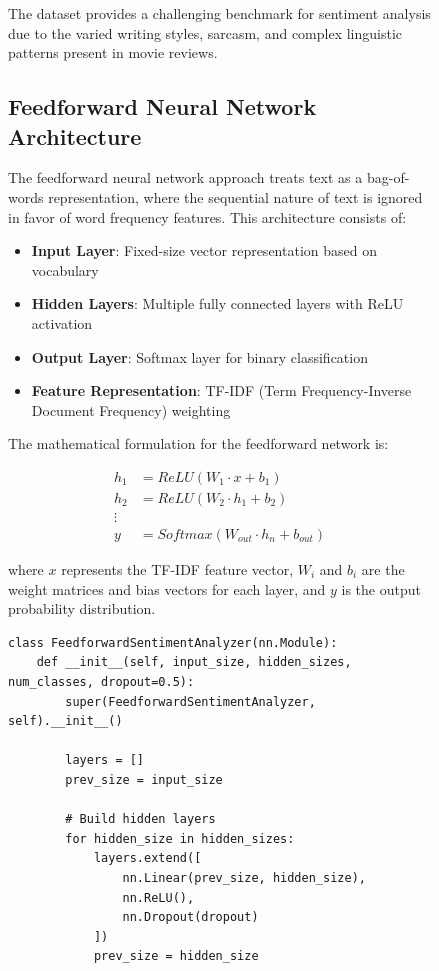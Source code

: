 \documentclass[a4paper, journal]{IEEEtran}
\begin{document}
\begin{figure}[!t]
The dataset provides a challenging benchmark for sentiment analysis due to the varied writing styles, sarcasm, and complex linguistic patterns present in movie reviews.

\subsection{Feedforward Neural Network Architecture}

The feedforward neural network approach treats text as a bag-of-words representation, where the sequential nature of text is ignored in favor of word frequency features. This architecture consists of:

\begin{itemize}
    \item \textbf{Input Layer}: Fixed-size vector representation based on vocabulary
    \item \textbf{Hidden Layers}: Multiple fully connected layers with ReLU activation
    \item \textbf{Output Layer}: Softmax layer for binary classification
    \item \textbf{Feature Representation}: TF-IDF (Term Frequency-Inverse Document Frequency) weighting
\end{itemize}

The mathematical formulation for the feedforward network is:

\begin{align}
h_1 &= ReLU(W_1 \cdot x + b_1) \\
h_2 &= ReLU(W_2 \cdot h_1 + b_2) \\
\vdots \\
y &= Softmax(W_{out} \cdot h_n + b_{out})
\end{align}

where $x$ represents the TF-IDF feature vector, $W_i$ and $b_i$ are the weight matrices and bias vectors for each layer, and $y$ is the output probability distribution.

\begin{lstlisting}[caption=Feedforward Neural Network Architecture]
class FeedforwardSentimentAnalyzer(nn.Module):
    def __init__(self, input_size, hidden_sizes, num_classes, dropout=0.5):
        super(FeedforwardSentimentAnalyzer, self).__init__()
        
        layers = []
        prev_size = input_size
        
        # Build hidden layers
        for hidden_size in hidden_sizes:
            layers.extend([
                nn.Linear(prev_size, hidden_size),
                nn.ReLU(),
                nn.Dropout(dropout)
            ])
            prev_size = hidden_size
        

\end{lstlisting}
\end{figure}
\end{document}
